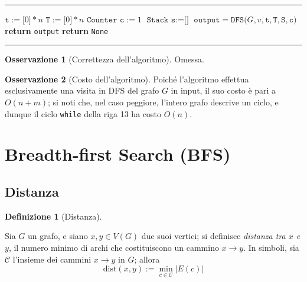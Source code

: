 \documentclass[14pt]{extreport}
\newenvironment{nocaptionalg} %
{
    \par\addvspace{\topsep}
    \centering
    \begin{minipage}{\linewidth}
    \hrule\kern2pt
}
{
    \par\kern2pt\hrule
    \end{minipage}
    \par\addvspace{\topsep}
}
\theoremstyle{definition}
\newtheorem{definition}{Definizione}[subsection]
\theoremstyle{definition}
\newtheorem{remark}{Osservazione}[subsection]
\begin{document}
\begin{nocaptionalg}
    \begin{algorithmic}[1]
            \State $\texttt{t} := \texttt{[}0\texttt{]} * n$
            \State $\texttt{T} := \texttt{[}0\texttt{]} * n$
            \State $\texttt{Counter c} := 1$
            \State $\texttt{Stack s} := \texttt{[]}$
                    \State $\texttt{output} = \texttt{DFS(}G, v, \texttt{t}, \texttt{T}, \texttt{S}, \texttt{c)}$
                        \State \textbf{return} \texttt{output}
                    \EndIf
                \EndIf
            \EndFor
            \State \textbf{return} \texttt{None}
        \EndFunction
    \end{algorithmic}
\end{nocaptionalg}

\begin{remark}[Correttezza dell'algoritmo]
    Omessa.
\end{remark}

\begin{remark}[Costo dell'algoritmo]
    Poiché l'algoritmo effettua esclusivamente una visita in DFS del grafo $G$ in input, il suo costo è pari a $O(n + m)$; si noti che, nel caso peggiore, l'intero grafo descrive un ciclo, e dunque il ciclo \texttt{while} della riga 13 ha costo $O(n)$.
\end{remark}

\section{Breadth-first Search (BFS)}

\subsection{Distanza}

\begin{definition}[Distanza]
    \label{distanza}

    Sia $G$ un grafo, e siano $x, y \in V(G)$ due suoi vertici; si definisce \textit{distanza tra $x$ e $y$}, il numero minimo di archi che costituiscono un cammino $x \rightarrow y$. In simboli, sia $\mathcal{C}$ l'insieme dei cammini $x \rightarrow y$ in $G$; allora $$\mathrm{dist}(x, y) := \min_{c \in \mathcal{C}}{\left |E(c) \right|}$$
\end{definition}
\end{document}
